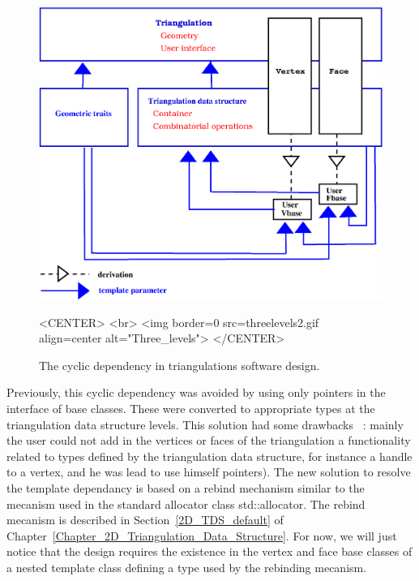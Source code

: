 \begin{figure}
\begin{ccTexOnly}
\begin{center}
\includegraphics[width=13cm]{threelevels2.eps}
\end{center}
\end{ccTexOnly}
\caption{The cyclic dependency in triangulations software design.
\label{2D_Triangulation_Fig_three_levels_2}}
\begin{ccHtmlOnly}
<CENTER>
<br>
<img border=0 src=threelevels2.gif align=center alt="Three_levels">
</CENTER>
\end{ccHtmlOnly}
\end{figure}

Previously, this cyclic dependency was avoided by 
using only  pointers in the interface of base classes.
These  were converted to appropriate types at the
triangulation data structure levels. This solution had some drawbacks
~: mainly the user could not add in the vertices or faces of the 
triangulation a functionality related to types defined by 
the triangulation data structure, for instance a handle to a vertex,
and he was lead to use himself 
  pointers).
The new solution to resolve the template dependancy
is based on a rebind mechanism similar to the mecanism used in the 
standard allocator class std::allocator. The rebind mecanism
is described in Section~\ref{2D_TDS_default} 
of Chapter~\ref{Chapter_2D_Triangulation_Data_Structure}.
For now, we will just notice that the design
requires
the existence in the vertex and face base classes 
of a nested template class
 defining a type  used by
the rebinding mecanism.


